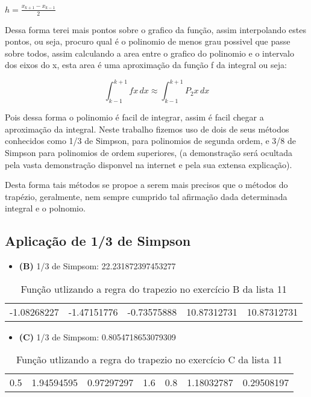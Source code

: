 \documentclass[12pt]{article}
\begin{document}
$h=\frac{x_{k+1} - x_{k-1}}{2}$

Dessa forma terei mais pontos sobre o grafico da função, assim interpolando estes pontos, ou seja, procuro qual é o polinomio de menos grau possivel que passe sobre todos, assim calculando a area entre o grafico do polinomio e o intervalo dos eixos do x, esta area é uma aproximação da função f da integral ou seja:


 \[\int_{k-1}^{k+1} \! fx \, dx \approx  \int_{k-1}^{k+1} \! P_{2}x \, dx \]

Pois dessa forma o polinomio é facil de integrar, assim é facil chegar a aproximação da integral. Neste trabalho fizemos uso de dois de seus métodos conhecidos como 1/3 de Simpson, para polinomios de segunda ordem, e 3/8 de Simpson para polinomios de ordem superiores, (a demonstração será ocultada pela vasta demonstração disponvel na internet e pela sua extensa explicação).

Desta forma tais métodos se propoe a serem mais precisos que o métodos do trapézio, geralmente, nem sempre cumprido tal afirmação dada determinada integral e o polnomio.

\subsection{Aplicação de 1/3 de Simpson}
\begin{itemize}
    \item \textbf{(B)} 1/3 de Simpsom: 22.231872397453277
\end{itemize}
\begin{table}[ht]
\centering
\begin{tabular}{|lllll|}
 -1.08268227 & -1.47151776 & -0.73575888 & 10.87312731 & 10.87312731
\end{tabular}
    \caption{Função utlizando a regra do trapezio no exercício B da lista 11}
\end{table}


\begin{itemize}
    \item \textbf{(C)} 1/3 de Simpsom: 0.8054718653079309
\end{itemize}
\begin{table}[ht]
\centering
\begin{tabular}{|lllllll|}
     0.5 & 1.94594595 &  0.97297297 & 1.6 & 0.8 & 1.18032787 & 0.29508197
\end{tabular}
    \caption{Função utlizando a regra do trapezio no exercício C da lista 11}
\end{table}
\end{document}
